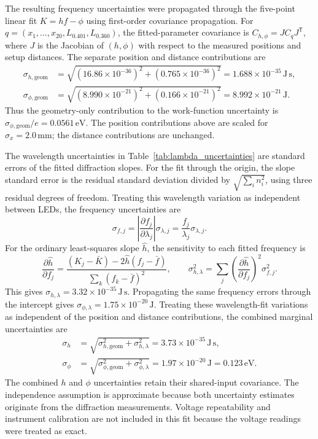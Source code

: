 \documentclass[12pt,a4paper]{article}
\begin{document}
The resulting frequency uncertainties were propagated through the five-point linear fit \(K=hf-\phi\) using first-order covariance propagation. For \(q=(x_1,\ldots,x_{20},L_{0.401},L_{0.360})\), the fitted-parameter covariance is \(C_{h,\phi}=J C_q J^\mathsf{T}\), where \(J\) is the Jacobian of \((h,\phi)\) with respect to the measured positions and setup distances. The separate position and distance contributions are
\[
    \begin{aligned}
    \sigma_{h,\mathrm{geom}} &=
    \sqrt{(16.86\times10^{-36})^2+(0.765\times10^{-36})^2}
    =1.688\times10^{-35}\,\mathrm{J\,s},\\
    \sigma_{\phi,\mathrm{geom}} &=
    \sqrt{(8.990\times10^{-21})^2+(0.166\times10^{-21})^2}
    =8.992\times10^{-21}\,\mathrm{J}.
    \end{aligned}
\]
Thus the geometry-only contribution to the work-function uncertainty is \(\sigma_{\phi,\mathrm{geom}}/e=0.0561\,\mathrm{eV}\). The position contributions above are scaled for \(\sigma_x=2.0\,\mathrm{mm}\); the distance contributions are unchanged.

The wavelength uncertainties in Table~\ref{tab:lambda_uncertainties} are standard errors of the fitted diffraction slopes. For the fit through the origin, the slope standard error is the residual standard deviation divided by \(\sqrt{\sum_i n_i^2}\), using three residual degrees of freedom. Treating this wavelength variation as independent between LEDs, the frequency uncertainties are
\[
    \sigma_{f,j} = \left|\frac{\partial f_j}{\partial\lambda_j}\right|
    \sigma_{\lambda,j}
    = \frac{f_j}{\lambda_j}\sigma_{\lambda,j}.
\]
For the ordinary least-squares slope \(\hat h\), the sensitivity to each fitted frequency is
\[
    \frac{\partial\hat h}{\partial f_j}
    = \frac{(K_j-\bar K)-2\hat h(f_j-\bar f)}
    {\sum_k(f_k-\bar f)^2},
    \qquad
    \sigma_{h,\lambda}^2 =
    \sum_j\left(\frac{\partial\hat h}{\partial f_j}\right)^2
    \sigma_{f,j}^2.
\]
This gives \(\sigma_{h,\lambda}=3.32\times10^{-35}\,\mathrm{J\,s}\). Propagating the same frequency errors through the intercept gives \(\sigma_{\phi,\lambda}=1.75\times10^{-20}\,\mathrm{J}\). Treating these wavelength-fit variations as independent of the position and distance contributions, the combined marginal uncertainties are
\[
    \begin{aligned}
    \sigma_h &= \sqrt{\sigma_{h,\mathrm{geom}}^2+
    \sigma_{h,\lambda}^2}
    = 3.73\times10^{-35}\,\mathrm{J\,s},\\
    \sigma_\phi &= \sqrt{\sigma_{\phi,\mathrm{geom}}^2+
    \sigma_{\phi,\lambda}^2}
    = 1.97\times10^{-20}\,\mathrm{J}
    = 0.123\,\mathrm{eV}.
    \end{aligned}
\]
The combined \(h\) and \(\phi\) uncertainties retain their shared-input covariance. The independence assumption is approximate because both uncertainty estimates originate from the diffraction measurements. Voltage repeatability and instrument calibration are not included in this fit because the voltage readings were treated as exact.
\end{document}

